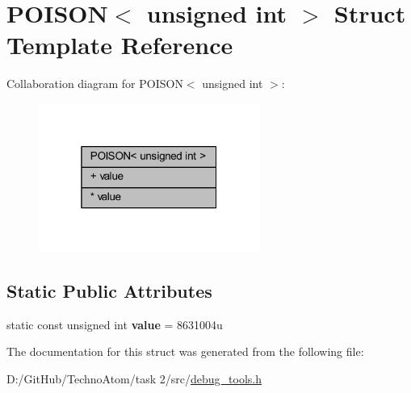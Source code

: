 \hypertarget{struct_p_o_i_s_o_n_3_01unsigned_01int_01_4}{}\section{P\+O\+I\+S\+ON$<$ unsigned int $>$ Struct Template Reference}
\label{struct_p_o_i_s_o_n_3_01unsigned_01int_01_4}


Collaboration diagram for P\+O\+I\+S\+ON$<$ unsigned int $>$\+:
\nopagebreak
\begin{figure}[H]
\begin{center}
\leavevmode
\includegraphics[width=205pt]{struct_p_o_i_s_o_n_3_01unsigned_01int_01_4__coll__graph}
\end{center}
\end{figure}
\subsection*{Static Public Attributes}
\textbf{ }\par
\begin{DoxyCompactItemize}
\item 
\mbox{\label{struct_p_o_i_s_o_n_3_01unsigned_01int_01_4_a5f0e085925546c8f4cd331922253dcbe}} 
static const unsigned int {\bfseries value} = 8631004u
\end{DoxyCompactItemize}



The documentation for this struct was generated from the following file\+:\begin{DoxyCompactItemize}
\item 
D\+:/\+Git\+Hub/\+Techno\+Atom/task 2/src/\hyperlink{debug__tools_8h}{debug\+\_\+tools.\+h}\end{DoxyCompactItemize}
